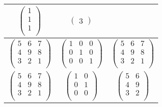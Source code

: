 \begin{table}[h!]
\begin{tabular}{||c|c|c||}
        $\begin{pmatrix}
            1\\
            1\\
            1\\
        \end{pmatrix}$
        &
        $\begin{pmatrix}
            3
        \end{pmatrix}$ \\
        \hline
        $\begin{pmatrix}
            5 & 6 & 7\\
            4 & 9 & 8\\
            3 & 2 & 1\\
        \end{pmatrix}$ 
        &  
        $\begin{pmatrix}
            1 & 0 & 0\\
            0 & 1 & 0\\
            0 & 0 & 1\\
        \end{pmatrix}$
        &
        $\begin{pmatrix}
            5 & 6 & 7\\
            4 & 9 & 8\\
            3 & 2 & 1\\
        \end{pmatrix}$ \\
        \hline
        $\begin{pmatrix}
            5 & 6 & 7\\
            4 & 9 & 8\\
            3 & 2 & 1\\
        \end{pmatrix}$ 
        &  
        $\begin{pmatrix}
            1 & 0\\
            0 & 1\\
            0 & 0\\
        \end{pmatrix}$
        &
        $\begin{pmatrix}
            5 & 6\\
            4 & 9\\
            3 & 2\\
        \end{pmatrix}$ \\
        \hline
        \end{tabular}
\end{table}

